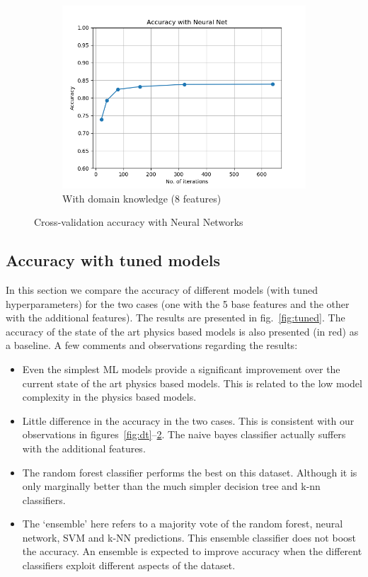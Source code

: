 \documentclass{article}
\begin{document}
\begin{figure}[h!]
\begin{subfigure}[b]{0.45\textwidth}
        \includegraphics[width=\textwidth]{../figures/w_domain_knowledge/accuracy_neural_nets.png}
        \caption{With domain knowledge (8  features)}
        \label{fig:tiger}
    \end{subfigure}
    \caption{Cross-validation accuracy with Neural Networks}\label{fig:nn}
\end{figure}

\subsection{Accuracy with tuned models}
In this section we compare the accuracy of different models (with tuned hyperparameters) for the two cases (one with the 5 base features and the other with the additional features). The results are presented in fig.~\ref{fig:tuned}. The accuracy of the state of the art physics based models is also presented (in red) as a baseline. A few comments and observations regarding the results:
\begin{itemize}
\item Even the simplest ML models provide a significant improvement over the current state of the art physics based models. This is related to the low model complexity in the physics based models.
\item Little difference in the accuracy in the two cases. This is consistent with our observations in figures~\ref{fig:dt}--\ref{fig:nn}. The naive bayes classifier actually suffers with the additional features.
\item The random forest classifier performs the best on this dataset. Although it is only marginally better than the much simpler decision tree and k-nn classifiers.
\item The `ensemble' here refers to a majority vote of the random forest, neural network, SVM and k-NN predictions. This ensemble classifier does not boost the accuracy. An ensemble is expected to improve accuracy when the different classifiers exploit different aspects of the dataset.
\end{itemize}
\end{document}
